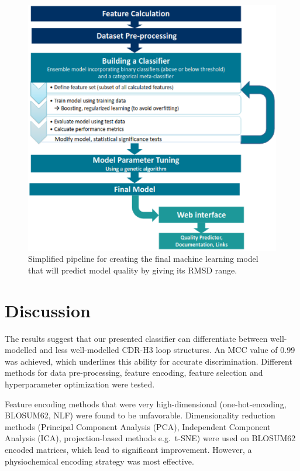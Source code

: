 \documentclass[12pt]{article}
\begin{document}
\begin{figure}
  \centering
  \includegraphics[width=\linewidth]{method.eps}
  \caption {Simplified pipeline for creating the final machine
    learning model that will predict model quality by giving its RMSD
    range.}
  \label{fig:method}
\end{figure}



\section{Discussion}
The results suggest that our presented classifier can differentiate
between well-modelled and less well-modelled CDR-H3 loop
structures. An MCC value of 0.99 was achieved, which underlines this
ability for accurate discrimination. Different methods for data
pre-processing, feature encoding, feature selection and hyperparameter
optimization were tested.

Feature encoding methods that were very high-dimensional
(one-hot-encoding, BLOSUM62, NLF) were found to be
unfavorable. Dimensionality reduction methods (Principal Component
Analysis (PCA), Independent Component Analysis (ICA), projection-based
methods e.g.\ t-SNE) were used on BLOSUM62 encoded matrices, which lead
to significant improvement. However, a physiochemical encoding
strategy was most effective.
\end{document}
